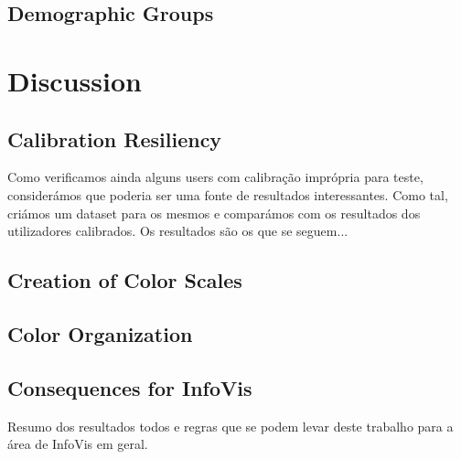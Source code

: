 \subsection{Demographic Groups}
\label{subsec:results_demographic}

\section{Discussion}
\label{sec:results_discussion}

\subsection{Calibration Resiliency}
\label{subsec:results_calibration}
%
Como verificamos ainda alguns users com calibração imprópria para teste, considerámos que poderia ser uma fonte de resultados
interessantes. Como tal, criámos um dataset para os mesmos e comparámos com os resultados dos utilizadores calibrados. Os resultados
são os que se seguem... \par
%
\subsection{Creation of Color Scales}
\label{subsec:results_discussion_colorscales}

\subsection{Color Organization}
\label{subsec:results_discussion_colororganization}

\subsection{Consequences for InfoVis}
\label{subsec:results_discussion_infovis}
%
Resumo dos resultados todos e regras que se podem levar deste trabalho para a área de InfoVis em geral.
%
